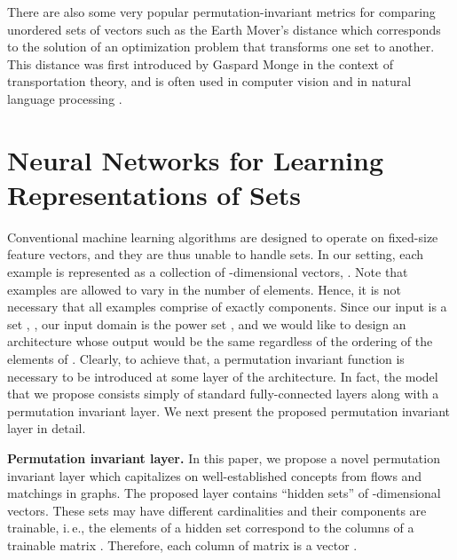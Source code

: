 \documentclass[twoside]{article}
\newcommand{\ie}{i.\,e., }
\begin{document}
There are also some very popular permutation-invariant metrics for comparing unordered sets of vectors such as the Earth Mover's distance which corresponds to the solution of an optimization problem that transforms one set to another.
This distance was first introduced by Gaspard Monge in the context of transportation theory, and is often used in computer vision \citep{rubner2000earth} and in natural language processing \citep{kusner2015word}.

\section{Neural Networks for Learning Representations of Sets}\label{sec:contribution}
Conventional machine learning algorithms are designed to operate on fixed-size feature vectors, and they are thus unable to handle sets.
In our setting, each example is represented as a collection  of -dimensional vectors, .
Note that examples are allowed to vary in the number of elements.
Hence, it is not necessary that all examples comprise of exactly  components.
Since our input is a set , , our input domain is the power set , and we would like to design an architecture whose output would be the same regardless of the ordering of the elements of .
Clearly, to achieve that, a permutation invariant function is necessary to be introduced at some layer of the architecture.
In fact, the model that we propose consists simply of standard fully-connected layers along with a permutation invariant layer.
We next present the proposed permutation invariant layer in detail.


\noindent\textbf{Permutation invariant layer.}
In this paper, we propose a novel permutation invariant layer which capitalizes on well-established concepts from flows and matchings in graphs.
The proposed layer contains  ``hidden sets''  of -dimensional vectors.
These sets may have different cardinalities and their components are trainable, \ie the elements of a hidden set  correspond to the columns of a trainable matrix .
Therefore, each column of matrix  is a vector .

\end{document}
